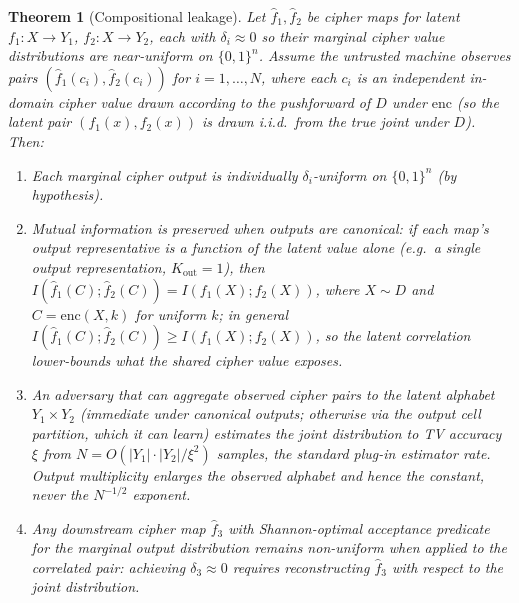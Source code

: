 \documentclass[conference]{IEEEtran}
\theoremstyle{definition}
\theoremstyle{plain}
\newtheorem{theorem}{Theorem}[section]
\theoremstyle{remark}
\newcommand{\fhat}{\hat{f}}
\newcommand{\enc}{\mathrm{enc}}
\newcommand{\B}{\{0,1\}}
\begin{document}
\begin{theorem}[Compositional leakage]
\label{thm:comp-leakage}
Let $\fhat_1, \fhat_2$ be cipher maps for latent $f_1 : X \to Y_1$,
$f_2 : X \to Y_2$, each with $\delta_i \approx 0$ so their marginal
cipher value distributions are near-uniform on $\B^n$.  Assume the
untrusted machine observes pairs $(\fhat_1(c_i), \fhat_2(c_i))$ for
$i = 1, \ldots, N$, where each $c_i$ is an independent in-domain
cipher value drawn according to the pushforward of $D$ under $\enc$
(so the latent pair $(f_1(x), f_2(x))$ is drawn i.i.d.\ from the
true joint under $D$).  Then:
\begin{enumerate}
\item Each marginal cipher output is individually $\delta_i$-uniform on
  $\B^n$ (by hypothesis).
\item Mutual information is preserved when outputs are canonical: if each
  map's output representative is a function of the latent value alone
  (e.g.\ a single output representation, $K_{\mathrm{out}} = 1$), then
  $I(\fhat_1(C); \fhat_2(C)) = I(f_1(X); f_2(X))$, where $X \sim D$ and
  $C = \enc(X, k)$ for uniform $k$; in general
  $I(\fhat_1(C); \fhat_2(C)) \geq I(f_1(X); f_2(X))$, so the latent
  correlation lower-bounds what the shared cipher value exposes.
\item An adversary that can aggregate observed cipher pairs to the latent
  alphabet $Y_1 \times Y_2$ (immediate under canonical outputs; otherwise
  via the output cell partition, which it can learn) estimates the joint
  distribution to TV accuracy $\xi$ from
  $N = O(|Y_1| \cdot |Y_2| / \xi^2)$ samples, the standard plug-in
  estimator rate.  Output multiplicity enlarges the observed alphabet and
  hence the constant, never the $N^{-1/2}$ exponent.
\item Any downstream cipher map $\fhat_3$ with Shannon-optimal
  acceptance predicate for the \emph{marginal} output distribution
  remains non-uniform when applied to the correlated pair:
  achieving $\delta_3 \approx 0$ requires reconstructing $\fhat_3$ with
  respect to the joint distribution.
\end{enumerate}
\end{theorem}
\end{document}
